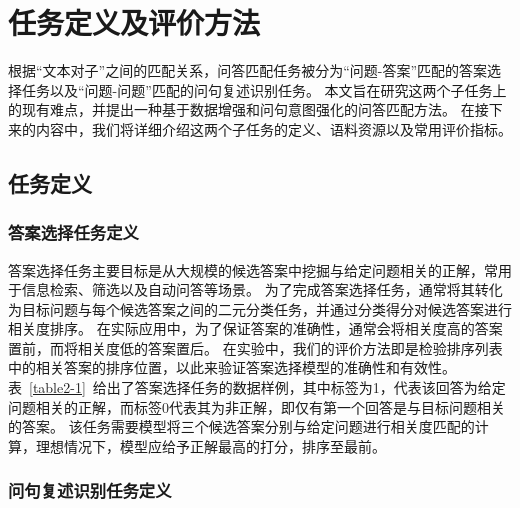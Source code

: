 \chapter{任务定义及评价方法}

根据“文本对子”之间的匹配关系，问答匹配任务被分为“问题-答案”匹配的答案选择任务以及“问题-问题”匹配的问句复述识别任务。
本文旨在研究这两个子任务上的现有难点，并提出一种基于数据增强和问句意图强化的问答匹配方法。
在接下来的内容中，我们将详细介绍这两个子任务的定义、语料资源以及常用评价指标。

\section{任务定义}

\subsection{答案选择任务定义}

答案选择任务主要目标是从大规模的候选答案中挖掘与给定问题相关的正解，常用于信息检索、筛选以及自动问答等场景。
为了完成答案选择任务，通常将其转化为目标问题与每个候选答案之间的二元分类任务，并通过分类得分对候选答案进行相关度排序。
在实际应用中，为了保证答案的准确性，通常会将相关度高的答案置前，而将相关度低的答案置后。
在实验中，我们的评价方法即是检验排序列表中的相关答案的排序位置，以此来验证答案选择模型的准确性和有效性。
表~\ref{table2-1}~给出了答案选择任务的数据样例，其中标签为1，代表该回答为给定问题相关的正解，而标签0代表其为非正解，即仅有第一个回答是与目标问题相关的答案。
该任务需要模型将三个候选答案分别与给定问题进行相关度匹配的计算，理想情况下，模型应给予正解最高的打分，排序至最前。



\subsection{问句复述识别任务定义}

